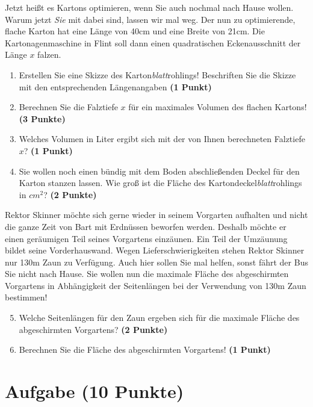 \documentclass[a4paper, 9pt]{scrartcl}\usepackage[]{graphicx}\usepackage[]{xcolor}
\begin{document}
Jetzt heißt es Kartons optimieren, wenn Sie auch nochmal nach Hause wollen. Warum jetzt \textit{Sie} mit dabei sind, lassen wir mal weg. Der nun zu optimierende, flache Karton hat eine Länge von 40cm und eine Breite von 21cm. Die Kartonagenmaschine in Flint soll dann einen quadratischen Eckenausschnitt der Länge $x$ falzen.

\begin{enumerate}
\item Erstellen Sie eine Skizze des Karton\textit{blatt}rohlings! Beschriften Sie die Skizze mit den entsprechenden Längenangaben \textbf{(1 Punkt)}
\item Berechnen Sie die Falztiefe $x$ für ein maximales Volumen des flachen Kartons! \textbf{(3 Punkte)}
\item Welches Volumen in Liter ergibt sich mit der von Ihnen berechneten Falztiefe $x$?  \textbf{(1 Punkt)}
\item Sie wollen noch einen bündig mit dem Boden abschließenden Deckel für den Karton stanzen lassen. Wie groß ist die Fläche des Kartondeckel\textit{blatt}rohlings in $cm^2$? \textbf{(2 Punkte)}
\end{enumerate}

Rektor Skinner möchte sich gerne wieder in seinem Vorgarten aufhalten und nicht die ganze Zeit von Bart mit Erdnüssen beworfen werden. Deshalb möchte er einen geräumigen Teil seines Vorgartens einzäunen. Ein Teil der Umzäunung bildet seine Vorderhauswand. Wegen Lieferschwierigkeiten stehen Rektor Skinner nur 130m Zaun zu Verfügung. Auch hier sollen Sie mal helfen, sonst fährt der Bus Sie nicht nach Hause. Sie wollen nun die maximale Fläche des abgeschirmten Vorgartens in Abhängigkeit der Seitenlängen bei der Verwendung von 130m Zaun bestimmen!

\begin{enumerate}
  \setcounter{enumi}{4}  
\item  Welche Seitenlängen für den Zaun ergeben sich für die maximale Fläche des abgeschirmten Vorgartens? \textbf{(2 Punkte)}
\item Berechnen Sie die Fläche des abgeschirmten Vorgartens! \textbf{(1 Punkt)}
\end{enumerate}

 
\clearpage

\section{Aufgabe \hfill (10 Punkte)}
\end{document}
